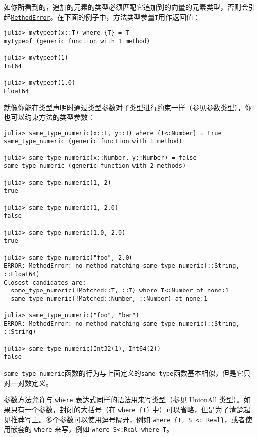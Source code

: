 如你所看到的，追加的元素的类型必须匹配它追加到的向量的元素类型，否则会引起\hyperlink{68769522931907606}{\texttt{MethodError}}。在下面的例子中，方法类型参量\texttt{T}用作返回值：




\begin{verbatim}
julia> mytypeof(x::T) where {T} = T
mytypeof (generic function with 1 method)

julia> mytypeof(1)
Int64

julia> mytypeof(1.0)
Float64
\end{verbatim}



就像你能在类型声明时通过类型参数对子类型进行约束一样（参见\hyperlink{5603543911318150609}{参数类型}），你也可以约束方法的类型参数：




\begin{verbatim}
julia> same_type_numeric(x::T, y::T) where {T<:Number} = true
same_type_numeric (generic function with 1 method)

julia> same_type_numeric(x::Number, y::Number) = false
same_type_numeric (generic function with 2 methods)

julia> same_type_numeric(1, 2)
true

julia> same_type_numeric(1, 2.0)
false

julia> same_type_numeric(1.0, 2.0)
true

julia> same_type_numeric("foo", 2.0)
ERROR: MethodError: no method matching same_type_numeric(::String, ::Float64)
Closest candidates are:
  same_type_numeric(!Matched::T, ::T) where T<:Number at none:1
  same_type_numeric(!Matched::Number, ::Number) at none:1

julia> same_type_numeric("foo", "bar")
ERROR: MethodError: no method matching same_type_numeric(::String, ::String)

julia> same_type_numeric(Int32(1), Int64(2))
false
\end{verbatim}



\texttt{same\_type\_numeric}函数的行为与上面定义的\texttt{same\_type}函数基本相似，但是它只对一对数定义。



参数方法允许与 \texttt{where} 表达式同样的语法用来写类型（参见 \hyperlink{11072845175692859046}{UnionAll 类型}）。如果只有一个参数，封闭的大括号（在 \texttt{where \{T\}} 中）可以省略，但是为了清楚起见推荐写上。多个参数可以使用逗号隔开，例如 \texttt{where \{T, S <: Real\}}，或者使用嵌套的 \texttt{where} 来写，例如 \texttt{where S<:Real where T}。



